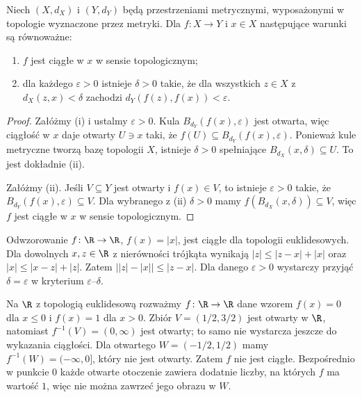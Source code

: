 \begin{twierdzenie}
\label{thm:topog-ciaglosc-eps-delta}
Niech $(X,d_X)$ i $(Y,d_Y)$ będą przestrzeniami
metrycznymi, wyposażonymi w topologie wyznaczone przez metryki.
Dla $f\colon X\to Y$ i $x\in X$ następujące warunki
są równoważne:
\begin{enumerate}[label=(\roman*)]
\item $f$ jest ciągłe w $x$ w sensie topologicznym;
\item dla każdego $\varepsilon>0$ istnieje $\delta>0$
      takie, że dla wszystkich $z\in X$ z
      $d_X(z,x)<\delta$ zachodzi
      $d_Y(f(z),f(x))<\varepsilon$.
\end{enumerate}
\end{twierdzenie}
\begin{proof}
Załóżmy (i) i ustalmy $\varepsilon>0$.
Kula $B_{d_Y}(f(x),\varepsilon)$ jest otwarta,
więc ciągłość w $x$ daje otwarty $U\ni x$ taki, że
$f(U)\subseteq B_{d_Y}(f(x),\varepsilon)$.
Ponieważ kule metryczne tworzą bazę topologii $X$,
istnieje $\delta>0$ spełniające $B_{d_X}(x,\delta)\subseteq U$.
To jest dokładnie (ii).

Załóżmy (ii). Jeśli $V\subseteq Y$ jest otwarty i
$f(x)\in V$, to istnieje $\varepsilon>0$ takie, że
$B_{d_Y}(f(x),\varepsilon)\subseteq V$.
Dla wybranego z (ii) $\delta>0$ mamy
$f(B_{d_X}(x,\delta))\subseteq V$, więc $f$
jest ciągłe w $x$ w sensie topologicznym.
\end{proof}

\begin{przyklad}
\label{ex:topog-ciaglosc-modul}
Odwzorowanie $f\colon\R\to\R$, $f(x)=|x|$,
jest ciągłe dla topologii euklidesowych. Dla dowolnych
$x,z\in\R$ z nierówności trójkąta wynikają
$|z|\le|z-x|+|x|$ oraz $|x|\le|x-z|+|z|$.
Zatem $\bigl||z|-|x|\bigr|\le|z-x|$.
Dla danego $\varepsilon>0$ wystarczy przyjąć
$\delta=\varepsilon$ w kryterium $\varepsilon$--$\delta$.
\end{przyklad}

\begin{przyklad}
\label{ex:topog-funkcja-nieciagla}
Na $\R$ z topologią euklidesową rozważmy
$f\colon\R\to\R$ dane wzorem
$f(x)=0$ dla $x\le0$ i $f(x)=1$ dla $x>0$.
Zbiór $V=(1/2,3/2)$ jest otwarty w $\R$, natomiast
$f^{-1}(V)=(0,\infty)$ jest otwarty; to samo
nie wystarcza jeszcze do wykazania ciągłości.
Dla otwartego $W=(-1/2,1/2)$ mamy
$f^{-1}(W)=(-\infty,0]$, który nie jest otwarty.
Zatem $f$ nie jest ciągłe. Bezpośrednio w punkcie
$0$ każde otwarte otoczenie zawiera dodatnie liczby,
na których $f$ ma wartość $1$, więc nie można zawrzeć
jego obrazu w $W$.
\end{przyklad}

